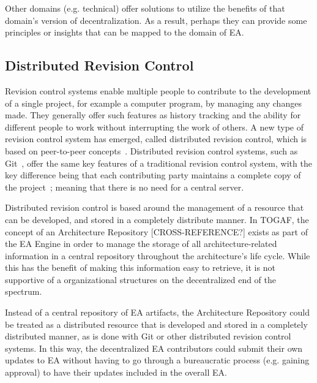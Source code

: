 Other domains (e.g. technical) offer solutions to utilize the benefits of that domain's version of decentralization. As a result, perhaps they can provide some principles or insights that can be mapped to the domain of EA. 

%
%

\subsection{Distributed Revision Control}







Revision control systems enable multiple people to contribute to the development of a single project, for example a computer program, by managing any changes made. They generally offer such features as history tracking and the ability for different people to work without interrupting the work of others. A new type of revision control system has emerged, called distributed revision control, which is based on peer-to-peer concepts~\cite{O'Sullivan2009}. Distributed revision control systems, such as Git~\cite{git}, offer the same key features of a traditional revision control system, with the key difference being that each contributing party maintains a complete copy of the project~\cite{O'Sullivan2009}; meaning that there is no need for a central server. 


Distributed revision control is based around the management of a resource that can be developed, and stored in a completely distribute manner. In TOGAF, the concept of an Architecture Repository [CROSS-REFERENCE?] exists as part of the EA Engine in order to manage the storage of all architecture-related information in a central repository throughout the architecture's life cycle. While this has the benefit of making this information easy to retrieve, it is not supportive of a organizational structures on the decentralized end of the spectrum. 

Instead of a central repository of EA artifacts, the Architecture Repository could be treated as a distributed resource that is developed and stored in a completely distributed manner, as is done with Git or other distributed revision control systems. In this way, the decentralized EA contributors could submit their own updates to EA without having to go through a bureaucratic process (e.g. gaining approval) to have their updates included in the overall EA. 

